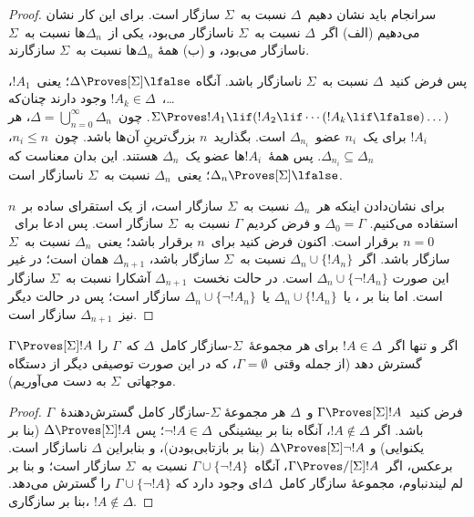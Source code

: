 \documentclass[../../../include/open-logic-section]{subfiles}
\begin{document}
\begin{proof}
سرانجام باید نشان دهیم~$\Delta$ نسبت به~$\Sigma$ سازگار است. برای این
کار نشان می‌دهیم (الف) اگر~$\Delta$ نسبت به~$\Sigma$ ناسازگار می‌بود،
یکی از~$\Delta_n$ها نسبت به~$\Sigma$ ناسازگار می‌بود، و (ب) همهٔ
$\Delta_n$ها نسبت به~$\Sigma$ سازگارند.

پس فرض کنید~$\Delta$ نسبت به~$\Sigma$ ناسازگار باشد. آنگاه
$\Delta \Proves[\Sigma] \lfalse$؛ یعنی~$!A_1$، \dots،~$!A_k \in
\Delta$ وجود دارند چنان‌که
$\Sigma \Proves !A_1 \lif (!A_2 \lif \cdots (!A_k \lif
\lfalse)\dots)$. چون~$\Delta = \bigcup_{n=0}^\infty \Delta_n$، هر
$!A_i$ برای یک~$n_i$ عضو~$\Delta_{n_i}$ است. بگذارید~$n$ بزرگ‌ترینِ
آن‌ها باشد. چون~$n_i \le n$، $\Delta_{n_i} \subseteq \Delta_n$. پس
همهٔ~$!A_i$ها عضو یک~$\Delta_n$ هستند. این بدان معناست که
$\Delta_n \Proves[\Sigma] \lfalse$؛ یعنی~$\Delta_n$ نسبت به~$\Sigma$
ناسازگار است.

برای نشان‌دادن اینکه هر~$\Delta_n$ نسبت به~$\Sigma$ سازگار است، از یک
استقرای ساده بر~$n$ استفاده می‌کنیم. $\Delta_0 = \Gamma$ و فرض کردیم
$\Gamma$ نسبت به~$\Sigma$ سازگار است. پس ادعا برای~$n=0$ برقرار است.
اکنون فرض کنید برای~$n$ برقرار باشد؛ یعنی~$\Delta_n$ نسبت به~$\Sigma$
سازگار باشد. اگر~$\Delta_n \cup \{!A_n\}$ نسبت به~$\Sigma$ سازگار
باشد، $\Delta_{n+1}$ همان است؛ در غیر این صورت
$\Delta_n \cup \{\lnot!A_n\}$ است. در حالت نخست~$\Delta_{n+1}$ آشکارا
نسبت به~$\Sigma$ سازگار است. اما بنا بر
،
یا~$\Delta_n \cup \{!A_n\}$ یا~$\Delta_n \cup \{\lnot!A_n\}$ سازگار
است؛ پس در حالت دیگر نیز~$\Delta_{n+1}$ سازگار است.
\end{proof}

\begin{cor}
  $\Gamma \Proves[\Sigma] !A$ اگر و تنها اگر~$!A \in \Delta$ برای هر
  مجموعهٔ~$\Sigma$-سازگار کامل~$\Delta$ که~$\Gamma$ را گسترش دهد
  (از جمله وقتی~$\Gamma = \emptyset$، که در این صورت توصیفی دیگر از
  دستگاه موجهاتی~$\Sigma$ به دست می‌آوریم).
\end{cor}

\begin{proof}
  فرض کنید~$\Gamma \Proves[\Sigma] !A$ و~$\Delta$ هر مجموعهٔ
  $\Sigma$-سازگار کامل گسترش‌دهندهٔ~$\Gamma$ باشد. اگر
  $!A \notin \Delta$، آنگاه بنا بر بیشینگی~$\lnot!A \in \Delta$؛ پس
  $\Delta \Proves[\Sigma] !A$ (بنا بر یکنوایی) و
  $\Delta \Proves[\Sigma] \lnot!A$ (بنا بر بازتابی‌بودن)، و بنابراین
  $\Delta$ ناسازگار است. برعکس، اگر~$\Gamma \Proves/[\Sigma] !A$،
  آنگاه~$\Gamma \cup \{\lnot!A\}$ نسبت به~$\Sigma$ سازگار است؛ و بنا
  بر لم لیندنباوم، مجموعهٔ سازگار کامل~$\Delta$ای وجود دارد که
  $\Gamma \cup \{\lnot!A\}$ را گسترش می‌دهد. بنا بر سازگاری،
  $!A \notin \Delta$.
\end{proof}
\end{document}
